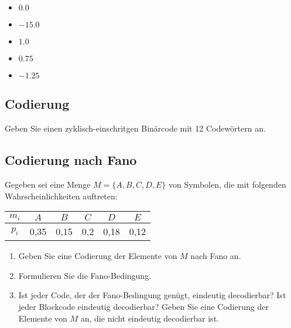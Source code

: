 \documentclass{exercisesheet}
\begin{document}
  \begin{solution*}
      \begin{itemize}
        \item $0.0$
        \item $-15.0$
        \item $1.0$
        \item $0.75$
        \item $-1.25$
      \end{itemize}
  \end{solution*}


    \subsection{Codierung}
      Geben Sie einen zyklisch-einschritgen Binärcode mit 12 Codewörtern an.

    \subsection{Codierung nach Fano}
      Gegeben sei eine Menge $M = \{A, B, C, D, E\}$ von Symbolen, die mit folgenden Wahrscheinlichkeiten auftreten:
      \begin{center}
        \begin{tabular}{c|ccccc}
          $m_i$ & $A$ & $B$ & $C$ & $D$ & $E$\\
          \hline
          $p_i$ & 0,35 & 0,15 & 0,2 & 0,18 & 0,12\\
        \end{tabular}
      \end{center}
      \begin{enumerate}
        \item\label{fano:1} Geben Sie eine Codierung der Elemente von $M$ nach Fano an.
        \item Formulieren Sie die Fano-Bedingung.
        \item Ist jeder Code, der der Fano-Bedingung genügt, eindeutig decodierbar? Ist jeder Blockcode eindeutig decodierbar? Geben Sie eine Codierung der Elemente von $M$ an, die nicht eindeutig decodierbar ist.
      \end{enumerate}
\end{document}
